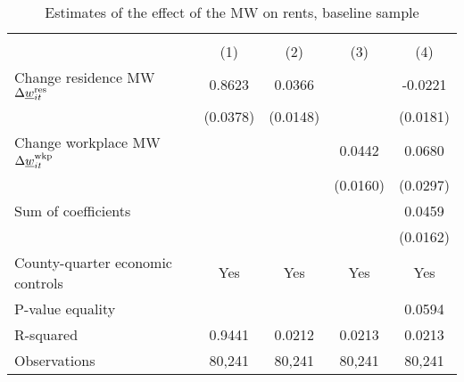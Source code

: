 \begin{table}[hbt!] \centering
    \caption{Estimates of the effect of the MW on rents, baseline sample}
    \label{tab:static}
    \begin{tabular}{l*{4}{c}}
        \toprule
        & 
            &  \\ \cmidrule(lr){2-2}\cmidrule(lr){3-5}
                                           & (1)   & (2)   & (3)   & (4)            \\ \midrule
        Change residence MW 
                  $\Delta\underline{w}_{it}^{\text{res}}$  &  0.8623  &  0.0366  &       &  -0.0221     \\
                                           & (0.0378) & (0.0148) &       & (0.0181)    \\
        Change workplace MW 
                   $\Delta\underline{w}_{it}^{\text{wkp}}$ &       &       &  0.0442  & 0.0680      \\
                                           &       &       & (0.0160) & (0.0297)    \\ \midrule
        Sum of coefficients                &       &       &       &  0.0459     \\
                                           &       &       &       & (0.0162)    \\ \midrule
        County-quarter economic controls   &  Yes  & Yes   & Yes   & Yes      \\
        P-value equality                   &       &       &       & 0.0594      \\
        R-squared                          &  0.9441  &  0.0212  &  0.0213  & 0.0213      \\
        Observations                       & 80,241  & 80,241  & 80,241  & 80,241     \\\bottomrule
    \end{tabular}


\end{table}

